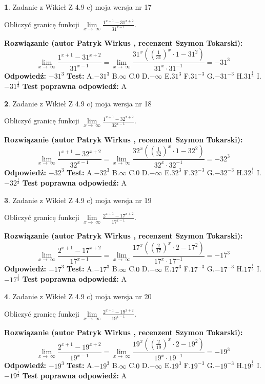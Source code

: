\documentclass[12pt, a4paper]{article}
\theoremstyle{definition} %
\newtheorem{zad}{}
\newcommand{\zadStart}[1]{\begin{zad}#1\newline}
\newcommand{\zadStop}{\end{zad}}
\newcommand{\rozwStart}[2]{\noindent \textbf{Rozwiązanie (autor #1 , recenzent #2): }\newline}
\newcommand{\rozwStop}{\newline}
\newcommand{\odpStart}{\noindent \textbf{Odpowiedź:}\newline}
\newcommand{\odpStop}{\newline}
\newcommand{\testStart}{\noindent \textbf{Test:}\newline}
\newcommand{\testStop}{\newline}
\newcommand{\kluczStart}{\noindent \textbf{Test poprawna odpowiedź:}\newline}
\newcommand{\kluczStop}{\newline}
\begin{document}
\zadStart{Zadanie z Wikieł Z 4.9 c) moja wersja nr 17}


Obliczyć granicę funkcji  $\lim\limits_{x\to\ \infty}\frac{1^{x+1}-31^{x+2}}{31^{x-1}}$.
\zadStop
\rozwStart{Patryk Wirkus}{Szymon Tokarski}
$$\lim\limits_{x\to\ \infty}\frac{1^{x+1}-31^{x+2}}{31^{x-1}}=\lim\limits_{x\to\ \infty}\frac{31^{x}((\frac{1}{31})^{x}\cdot 1 -31^{2})}{31^{x}\cdot 31^{-1}} = -31^{3}$$
\rozwStop
\odpStart
$-31^{3}$
\odpStop
\testStart
A.$-31^{3}$ B.$\infty$ C.$0$ D.$-\infty$ E.$31^{3}$
F.$31^{-3}$ G.$-31^{-3}$
H.$31^{\frac{1}{3}}$
I.$-31^{\frac{1}{3}}$
\testStop
\kluczStart
A
\kluczStop



\zadStart{Zadanie z Wikieł Z 4.9 c) moja wersja nr 18}


Obliczyć granicę funkcji  $\lim\limits_{x\to\ \infty}\frac{1^{x+1}-32^{x+2}}{32^{x-1}}$.
\zadStop
\rozwStart{Patryk Wirkus}{Szymon Tokarski}
$$\lim\limits_{x\to\ \infty}\frac{1^{x+1}-32^{x+2}}{32^{x-1}}=\lim\limits_{x\to\ \infty}\frac{32^{x}((\frac{1}{32})^{x}\cdot 1 -32^{2})}{32^{x}\cdot 32^{-1}} = -32^{3}$$
\rozwStop
\odpStart
$-32^{3}$
\odpStop
\testStart
A.$-32^{3}$ B.$\infty$ C.$0$ D.$-\infty$ E.$32^{3}$
F.$32^{-3}$ G.$-32^{-3}$
H.$32^{\frac{1}{3}}$
I.$-32^{\frac{1}{3}}$
\testStop
\kluczStart
A
\kluczStop



\zadStart{Zadanie z Wikieł Z 4.9 c) moja wersja nr 19}


Obliczyć granicę funkcji  $\lim\limits_{x\to\ \infty}\frac{2^{x+1}-17^{x+2}}{17^{x-1}}$.
\zadStop
\rozwStart{Patryk Wirkus}{Szymon Tokarski}
$$\lim\limits_{x\to\ \infty}\frac{2^{x+1}-17^{x+2}}{17^{x-1}}=\lim\limits_{x\to\ \infty}\frac{17^{x}((\frac{2}{17})^{x}\cdot 2 -17^{2})}{17^{x}\cdot 17^{-1}} = -17^{3}$$
\rozwStop
\odpStart
$-17^{3}$
\odpStop
\testStart
A.$-17^{3}$ B.$\infty$ C.$0$ D.$-\infty$ E.$17^{3}$
F.$17^{-3}$ G.$-17^{-3}$
H.$17^{\frac{1}{3}}$
I.$-17^{\frac{1}{3}}$
\testStop
\kluczStart
A
\kluczStop



\zadStart{Zadanie z Wikieł Z 4.9 c) moja wersja nr 20}


Obliczyć granicę funkcji  $\lim\limits_{x\to\ \infty}\frac{2^{x+1}-19^{x+2}}{19^{x-1}}$.
\zadStop
\rozwStart{Patryk Wirkus}{Szymon Tokarski}
$$\lim\limits_{x\to\ \infty}\frac{2^{x+1}-19^{x+2}}{19^{x-1}}=\lim\limits_{x\to\ \infty}\frac{19^{x}((\frac{2}{19})^{x}\cdot 2 -19^{2})}{19^{x}\cdot 19^{-1}} = -19^{3}$$
\rozwStop
\odpStart
$-19^{3}$
\odpStop
\testStart
A.$-19^{3}$ B.$\infty$ C.$0$ D.$-\infty$ E.$19^{3}$
F.$19^{-3}$ G.$-19^{-3}$
H.$19^{\frac{1}{3}}$
I.$-19^{\frac{1}{3}}$
\testStop
\kluczStart
A
\kluczStop
\end{document}
